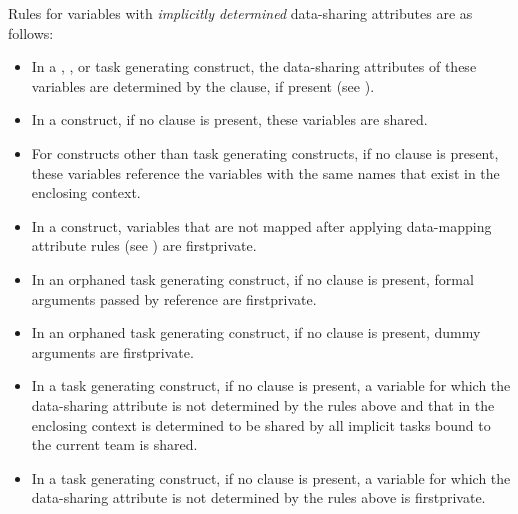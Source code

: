 Rules for variables with \emph{implicitly determined} data-sharing attributes are as follows:

\begin{itemize}
\item In a , , or task generating construct, the data-sharing attributes of these variables are
determined by the  clause, if present (see
).

\item In a  construct, if no  clause is present, these variables are
shared.

\item For constructs other than task generating constructs, if no  clause is present, these variables reference the variables with the same names that exist in the enclosing context.

\item In a  construct, variables that are not mapped after applying data-mapping attribute rules (see ) are firstprivate.
\end{itemize}

\begin{cppspecific}
\begin{itemize}
\item In an orphaned task generating
construct, if no  clause is present, formal arguments passed by reference are firstprivate.
\end{itemize}
\end{cppspecific}
%
\begin{fortranspecific}
\begin{itemize}
\item In an orphaned task generating
construct, if no  clause is present, dummy arguments
are firstprivate.
\end{itemize}
\end{fortranspecific}
%
\begin{itemize}
\item In a task generating construct, if no  clause is present, a variable
for which the data-sharing attribute is not determined by the rules above
and that in the enclosing context is determined to be shared by all implicit tasks bound
to the current team is shared.

\item In a task generating construct, if no
 clause is present, a variable for which the data-sharing
attribute is not determined by the rules above is firstprivate.
\end{itemize}

